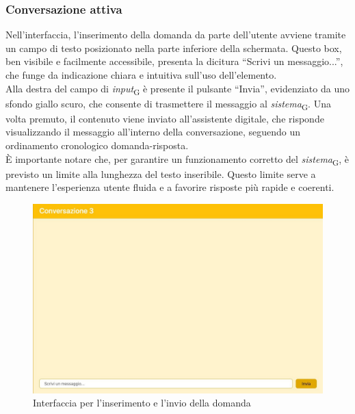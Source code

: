 \subsubsection{Conversazione attiva}
Nell’interfaccia, l’inserimento della domanda da parte dell’utente avviene tramite un campo di testo posizionato nella parte inferiore della schermata. Questo box, ben visibile e facilmente accessibile, presenta la dicitura “Scrivi un messaggio...”, che funge da indicazione chiara e intuitiva sull’uso dell’elemento. \\
Alla destra del campo di \textit{input}\textsubscript{G} è presente il pulsante “Invia”, evidenziato da uno sfondo giallo scuro, che consente di trasmettere il messaggio al \textit{sistema}\textsubscript{G}. Una volta premuto, il contenuto viene inviato all’assistente digitale, che risponde visualizzando il messaggio all’interno della conversazione, seguendo un ordinamento cronologico domanda-risposta. \\
È importante notare che, per garantire un funzionamento corretto del \textit{sistema}\textsubscript{G}, è previsto un limite alla lunghezza del testo inseribile. Questo limite serve a mantenere l’esperienza utente fluida e a favorire risposte più rapide e coerenti.
\begin{figure}[H]
\centering
\includegraphics[width=1\textwidth]{contents/img/conv_pc.jpg}
\caption{Interfaccia per l'inserimento e l'invio della domanda}
\end{figure}

